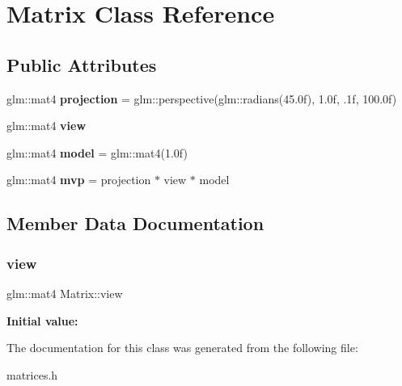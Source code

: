\hypertarget{classMatrix}{}\section{Matrix Class Reference}
\label{classMatrix}
\subsection*{Public Attributes}
\begin{DoxyCompactItemize}
\item 
\mbox{\label{classMatrix_a6ab938ab4d1e3dd2a825ef4f4180115c}} 
glm\+::mat4 {\bfseries projection} = glm\+::perspective(glm\+::radians(45.\+0f), 1.\+0f, .\+1f, 100.\+0f)
\item 
glm\+::mat4 {\bfseries view}
\item 
\mbox{\label{classMatrix_a331798e1e45c9fc7476664b949dfbd3b}} 
glm\+::mat4 {\bfseries model} = glm\+::mat4(1.\+0f)
\item 
\mbox{\label{classMatrix_af82b6f9a0690fba436a830e9a91b0841}} 
glm\+::mat4 {\bfseries mvp} = projection $\ast$ view $\ast$ model
\end{DoxyCompactItemize}


\subsection{Member Data Documentation}
\mbox{\label{classMatrix_a72608a4407a76c0e564fc70b3d7a66d3}} 
\subsubsection{\texorpdfstring{view}{view}}
{\footnotesize\ttfamily glm\+::mat4 Matrix\+::view}

{\bfseries Initial value\+:}
\begin{DoxyCode}{0}
\DoxyCodeLine{    )}

\end{DoxyCode}


The documentation for this class was generated from the following file\+:\begin{DoxyCompactItemize}
\item 
matrices.\+h\end{DoxyCompactItemize}

